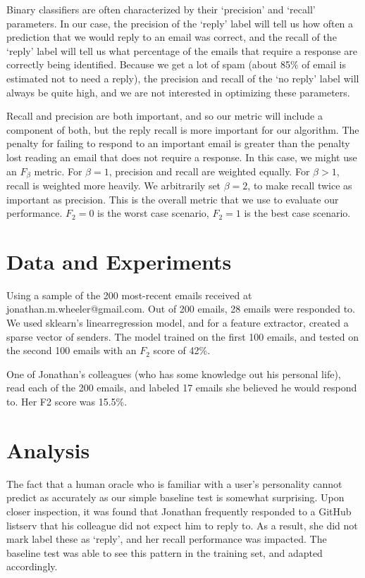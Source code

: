 \documentclass{article}
\begin{document}
Binary classifiers are often characterized by their `precision' and `recall' parameters. In our case, the precision of the `reply' label will tell us how often a prediction that we would reply to an email was correct, and the recall of the `reply' label will tell us what percentage of the emails that require a response are correctly being identified. Because we get a lot of spam (about 85\% of email is estimated not to need a reply), the precision and recall of the `no reply' label will always be quite high, and we are not interested in optimizing these parameters.

Recall and precision are both important, and so our metric will include a component of both, but the reply recall is more important for our algorithm. The penalty for failing to respond to an important email is greater than the penalty lost reading an email that does not require a response. In this case, we might use an $F_\beta$ metric.\cite{fbetawikipedia} For $\beta = 1$, precision and recall are weighted equally. For $\beta > 1$, recall is weighted more heavily. We arbitrarily set $\beta = 2$, to make recall twice as important as precision. This is the overall metric that we use to evaluate our performance. $F_2 = 0$ is the worst case scenario, $F_2 = 1$ is the best case scenario.

\section{Data and Experiments}
Using a sample of the 200 most-recent emails received at jonathan.m.wheeler@gmail.com. Out of 200 emails, 28 emails were responded to. We used sklearn's linearregression model, and for a feature extractor, created a sparse vector of senders. The model trained on the first 100 emails, and tested on the second 100 emails with an $F_2$ score of 42\%. 

One of Jonathan's colleagues (who has some knowledge out his personal life), read each of the 200 emails, and labeled 17 emails she believed he would respond to. Her F2 score was 15.5\%.

\section{Analysis}
The fact that a human oracle who is familiar with a user's personality cannot predict as accurately as our simple baseline test is somewhat surprising. Upon closer inspection, it was found that Jonathan frequently responded to a GitHub listserv that his colleague did not expect him to reply to. As a result, she did not mark label these as `reply', and her recall performance was impacted. The baseline test was able to see this pattern in the training set, and adapted accordingly.
\end{document}
